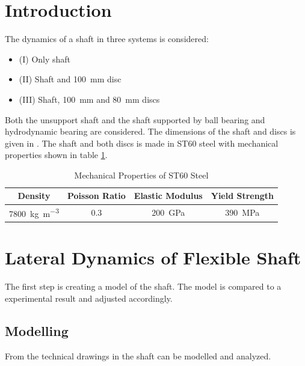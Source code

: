 \section{Introduction}
The dynamics of a shaft in three systems is considered:
\begin{itemize}
    \item (I) Only shaft
    \item (II) Shaft and \SI{100}{\milli \meter} disc
    \item (III) Shaft, \SI{100}{\milli \meter} and \SI{80}{\milli \meter} discs
\end{itemize}
Both the unsupport shaft and the shaft supported by ball bearing and hydrodynamic bearing are considered. The dimensions of the shaft and discs is given in \cite[Appendix]{Problem}.
The shaft and both discs is made in ST60 steel with mechanical properties shown in table \ref{tab:mech_prop}.
\begin{table}[htbp]
    \centering
    \caption{Mechanical Properties of ST60 Steel}
    \label{tab:mech_prop}
    \begin{tabular}{@{}cccc@{}}
        \toprule
        Density                                     &   Poisson Ratio   &   Elastic Modulus         &   Yield Strength \\ \midrule
        \SI{7800}{\kilo \gram \per \cubic \meter} &   0.3             &   \SI{200}{\giga \pascal} &   \SI{390}{\mega \pascal}                               \\ \bottomrule
    \end{tabular}
\end{table}

\section{Lateral Dynamics of Flexible Shaft}
The first step is creating a model of the shaft. The model is compared to a experimental result and adjusted accordingly.

\subsection{Modelling}
From the technical drawings in \cite[Appendix]{Problem} the shaft can be modelled and analyzed.


